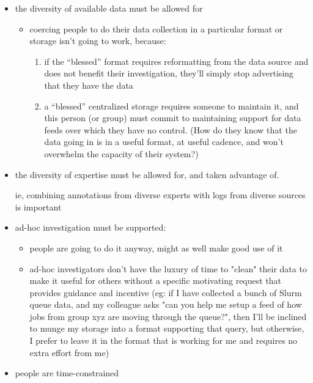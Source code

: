 \begin{itemize}
\item the diversity of available data must be allowed for
\begin{itemize}
\item coercing people to do their data collection in a particular format
      or storage isn't going to work, because:
      
\begin{enumerate}
\item if the ``blessed'' format requires reformatting from the data source
      and does not benefit their investigation, they'll simply stop 
      advertising that they have the data
\item a ``blessed'' centralized storage requires someone to maintain it,
      and this person (or group) must commit to maintaining support for 
      data feeds over which they have no control. (How do they know that 
      the data going in is in a useful format, at useful cadence, and
      won't overwhelm the capacity of their system?)
\end{enumerate}
\end{itemize}

\item the diversity of expertise must be allowed for, and taken advantage of.

      ie, combining annotations from diverse experts with logs from diverse 
      sources is important
      
\item ad-hoc investigation must be supported:
\begin{itemize}
\item people are going to do it anyway, might as well make good use of it
\item ad-hoc investigators don't have the luxury of time to "clean" their 
      data to make it useful for others without a specific motivating 
      request that provides guidance and incentive
      (eg: if I have collected a bunch of Slurm queue data, and my colleague 
      asks "can you help me setup a feed of how jobs from group xyz are moving 
      through the queue?", then I'll be inclined to munge my storage into a 
      format supporting that query, but otherwise, I prefer to leave it in the 
      format that is working for me and requires no extra effort from me)
\end{itemize}

\item people are time-constrained


\end{itemize}
